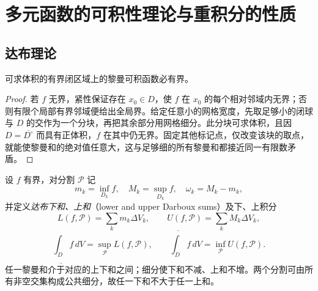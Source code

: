 \section{多元函数的可积性理论与重积分的性质}
\label{sec:multivariable-integrability-and-multiple-integral-properties}

\subsection{达布理论}
\label{subsec:multivariable-darboux-theory}

\begin{theorem}
\label{thm:multiple-integrable-bounded}
可求体积的有界闭区域上的黎曼可积函数必有界。
\end{theorem}
\begin{proof}
若 $f$ 无界，紧性保证存在 $x_0\in D$，使 $f$ 在 $x_0$ 的每个相对邻域内无界；否则有限个局部有界邻域便给出全局界。给定任意小的网格宽度，先取足够小的闭球与 $D$ 的交作为一个分块，再把其余部分用网格细分。此分块可求体积，且因 $D=\overline{D^\circ}$ 而具有正体积，$f$ 在其中仍无界。固定其他标记点，仅改变该块的取点，就能使黎曼和的绝对值任意大，这与足够细的所有黎曼和都接近同一有限数矛盾。
\end{proof}

设 $f$ 有界，对分割 $\mathcal P$ 记
\[
    m_k=\inf_{D_k}f,\quad M_k=\sup_{D_k}f,\quad
    \omega_k=M_k-m_k,
\]
并定义\emph{达布下和、上和}（lower and upper Darboux sums）及下、上积分
\[
    L(f,\mathcal P)=\sum_km_k\Delta V_k,\qquad
    U(f,\mathcal P)=\sum_kM_k\Delta V_k,
\]
\[
    \underline{\int_D}f\,dV=\sup_{\mathcal P}L(f,\mathcal P),\qquad
    \overline{\int_D}f\,dV=\inf_{\mathcal P}U(f,\mathcal P).
\]
任一黎曼和介于对应的上下和之间；细分使下和不减、上和不增。两个分割可由所有非空交集构成公共细分，故任一下和不大于任一上和。

